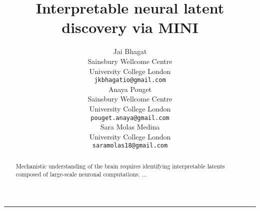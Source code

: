 \documentclass{article}
\title{Interpretable neural latent discovery via MINI}
\author{
  Jai Bhagat \\
  Sainsbury Wellcome Centre \\
  University College London \\
  \texttt{jkbhagatio@gmail.com} \\
  \And
  Anaya Pouget \\
  Sainsbury Wellcome Centre \\
  University College London \\
  \texttt{pouget.anaya@gmail.com} \\
  \And
  Sara Molas Medina \\
  University College London \\
  \texttt{saramolas18@gmail.com} \\
}
\begin{document}
\maketitle

\begin{abstract}
Mechanistic understanding of the brain requires identifying interpretable latents composed of large-scale neuronal computations. ...
\end{abstract}






\vspace{2em} \hrule  
\newpage

\nocite{lenail_2019_nnsvg}






\end{document}
